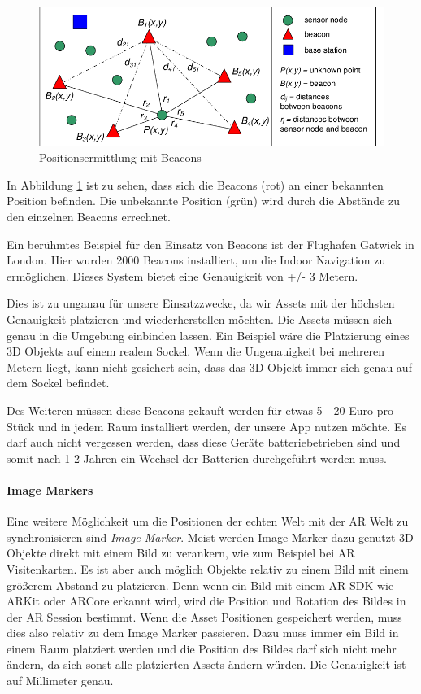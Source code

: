 \documentclass[titlepage, a4paper, 11pt]{scrartcl}
\begin{document}
  \begin{figure}[h]
    \centering
    \includegraphics[width=.6\textwidth]{beacons}
    \caption{Positionsermittlung mit Beacons \cite{beaconNetwork}}
    \label{Beacons}
  \end{figure}

  In Abbildung \ref{Beacons} ist zu sehen, dass sich die Beacons (rot) an einer bekannten Position befinden. Die unbekannte Position (grün) wird durch die Abstände zu den einzelnen Beacons errechnet.

  Ein berühmtes Beispiel für den Einsatz von Beacons ist der Flughafen Gatwick in London. Hier wurden 2000 Beacons installiert, um die Indoor Navigation zu ermöglichen. \cite{GatwickA64:online} 
  Dieses System bietet eine Genauigkeit von +/- 3 Metern.
  
  Dies ist zu unganau für unsere Einsatzzwecke, da wir Assets mit der höchsten Genauigkeit platzieren und wiederherstellen möchten. Die Assets müssen sich genau in die Umgebung einbinden lassen.
  Ein Beispiel wäre die Platzierung eines 3D Objekts auf einem realem Sockel. Wenn die Ungenauigkeit bei mehreren Metern liegt, kann nicht gesichert sein, dass das 3D Objekt immer sich genau auf dem Sockel befindet.

  Des Weiteren müssen diese Beacons gekauft werden für etwas 5 - 20 Euro pro Stück und in jedem Raum installiert werden, der unsere App nutzen möchte.
  Es darf auch nicht vergessen werden, dass diese Geräte batteriebetrieben sind und somit nach 1-2 Jahren ein Wechsel der Batterien durchgeführt werden muss. 

  \paragraph{Image Markers}

  Eine weitere Möglichkeit um die Positionen der echten Welt mit der AR Welt zu synchronisieren sind \textit{Image Marker}. Meist werden Image Marker dazu genutzt 3D Objekte direkt mit einem Bild zu verankern, wie zum Beispiel bei AR Visitenkarten.
  Es ist aber auch möglich Objekte relativ zu einem Bild mit einem größerem Abstand zu platzieren. Denn wenn ein Bild mit einem AR SDK wie ARKit oder ARCore erkannt wird, wird die Position und Rotation des Bildes in der AR Session bestimmt.
  Wenn die Asset Positionen gespeichert werden, muss dies also relativ zu dem Image Marker passieren. Dazu muss immer ein Bild in einem Raum platziert werden und die Position des Bildes darf sich nicht mehr ändern, da sich sonst alle platzierten Assets ändern würden.
  Die Genauigkeit ist auf Millimeter genau. \cite{HowAugme98:online}
  
\end{document}
